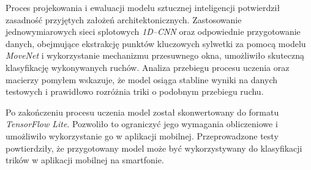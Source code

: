 Proces projekowania i ewaluacji modelu sztucznej inteligencji potwierdził zasadność przyjętych założeń architektonicznych. Zastosowanie jednowymiarowych sieci splotowych \textit{1D–CNN} oraz odpowiednie przygotowanie danych, obejmujące ekstrakcję punktów kluczowych sylwetki za pomocą modelu \textit{MoveNet} i wykorzystanie mechanizmu przesuwnego okna, umożliwiło skuteczną klasyfikację wykonywanych ruchów. Analiza przebiegu procesu uczenia oraz macierzy pomyłem wskazuje, że model osiąga stabline wyniki na danych testowych i prawidłowo rozróżnia triki o podobnym przebiegu ruchu.

Po zakończeniu procesu uczenia model został skonwertowany do formatu 
\textit{TensorFlow Lite}. Pozwoliło to ograniczyć jego wymagania obliczeniowe i umożliwiło wykorzystanie go w aplikacji mobilnej. Przeprowadzone testy powtierdziły, że przygotowany model może być wykorzystywany do klasyfikacji trików w aplikacji mobilnej na smartfonie.

